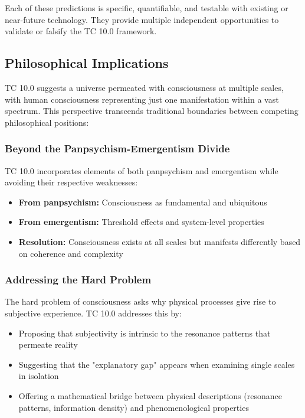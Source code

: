 \documentclass[12pt]{article}
\begin{document}
Each of these predictions is specific, quantifiable, and testable with existing or near-future technology. They provide multiple independent opportunities to validate or falsify the TC 10.0 framework.

\subsection{Philosophical Implications}

TC 10.0 suggests a universe permeated with consciousness at multiple scales, with human consciousness representing just one manifestation within a vast spectrum. This perspective transcends traditional boundaries between competing philosophical positions:

\subsubsection{Beyond the Panpsychism-Emergentism Divide}

TC 10.0 incorporates elements of both panpsychism and emergentism while avoiding their respective weaknesses:

\begin{itemize}
    \item \textbf{From panpsychism:} Consciousness as fundamental and ubiquitous
    \item \textbf{From emergentism:} Threshold effects and system-level properties
    \item \textbf{Resolution:} Consciousness exists at all scales but manifests differently based on coherence and complexity
\end{itemize}

\subsubsection{Addressing the Hard Problem}

The hard problem of consciousness \cite{chalmers1995} asks why physical processes give rise to subjective experience. TC 10.0 addresses this by:

\begin{itemize}
    \item Proposing that subjectivity is intrinsic to the resonance patterns that permeate reality
    \item Suggesting that the "explanatory gap" appears when examining single scales in isolation
    \item Offering a mathematical bridge between physical descriptions (resonance patterns, information density) and phenomenological properties
\end{itemize}
\end{document}
